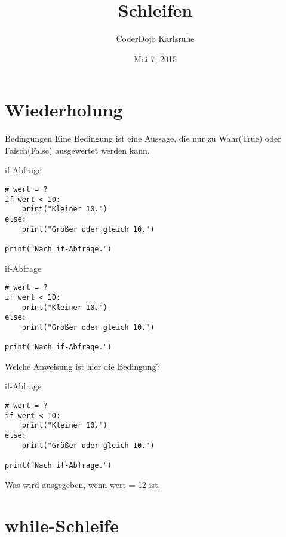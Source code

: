 \documentclass{\VorlagenPfad/coderdojokabeamer}
\title{Schleifen}
\author{CoderDojo Karlsruhe}
\date{Mai 7, 2015}
\newcommand{\code}[1]{{\ttfamily #1}}
\begin{document}
\maketitle

\section{Wiederholung}

\begin{frame}{Bedingungen} 
Eine Bedingung ist eine Aussage, die nur zu Wahr(\code{True}) oder Falsch(\code{False}) ausgewertet werden kann.

\end{frame}

\begin{frame}[fragile]{if-Abfrage}
	\begin{verbatim}
# wert = ?
if wert < 10:
	print("Kleiner 10.")
else:
	print("Größer oder gleich 10.")

print("Nach if-Abfrage.")
	\end{verbatim}
\end{frame}

\begin{frame}[fragile]{if-Abfrage}
	\begin{verbatim}
# wert = ?
if wert < 10:
	print("Kleiner 10.")
else:
	print("Größer oder gleich 10.")
		
print("Nach if-Abfrage.")
	\end{verbatim}
Welche Anweisung ist hier die Bedingung?\\

\end{frame}



\begin{frame}[fragile]{if-Abfrage}
	\begin{verbatim}
# wert = ?
if wert < 10:
	print("Kleiner 10.")
else:
	print("Größer oder gleich 10.")
	
print("Nach if-Abfrage.")
\end{verbatim}

Was wird ausgegeben, wenn \code{wert = 12} ist.
\end{frame}






\section{while-Schleife}
\end{document}
